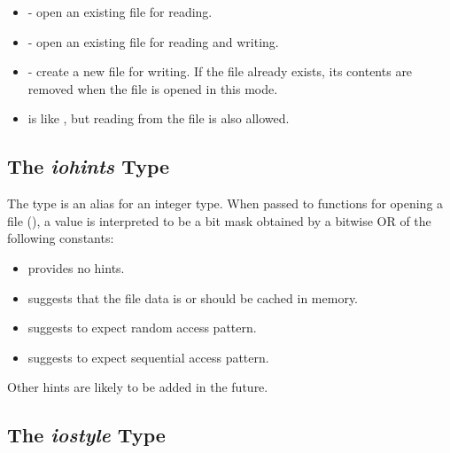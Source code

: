 \begin{itemize}

\item {} - open an existing file for reading.

\item {} - open an existing file for reading and writing.

\item {} - create a new file for writing.
      If the file already exists, its contents are removed
      when the file is opened in this mode.

\item {} is like ,
      but reading from the file is also allowed.

\end{itemize}


\subsection{The {\em iohints} Type}
\label{IO_iohints_type}

The  type is an alias for an integer type.
When passed to functions for opening a file (),
a  value is interpreted to be a bit mask obtained
by a bitwise OR of the following constants:


\begin{itemize}

\item {} provides no hints.

\item {} suggests that the file data is or should be
      cached in memory.

\item {} suggests to expect random access pattern.

\item {} suggests to expect sequential access pattern.

\end{itemize}

\begin{future}
Other hints are likely to be added in the future.
\end{future}


\subsection{The {\em iostyle} Type}
\label{IO_iostyle_type}

